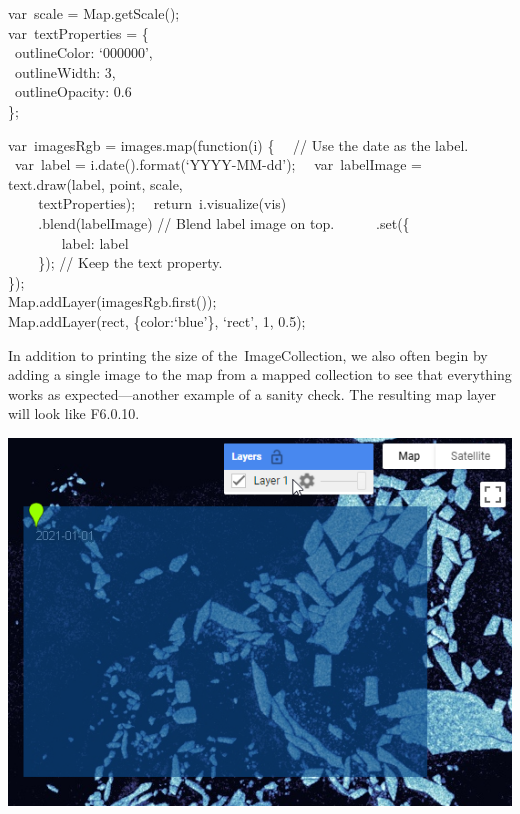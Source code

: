 \documentclass[
  letterpaper,
  DIV=11,
  numbers=noendperiod]{scrreprt}
\begin{document}
var~scale = Map.getScale();\\
var~textProperties = \{\\
\hspace*{0.333em} ~outlineColor: `000000',\\
\hspace*{0.333em} ~outlineWidth: 3,\\
\hspace*{0.333em} ~outlineOpacity: 0.6\\
\};

var~imagesRgb = images.map(function(i) \{~ ~// Use the date as the
label.~ ~var~label = i.date().format(`YYYY-MM-dd');~ ~var~labelImage =
text.draw(label, point, scale,\\
\hspace*{0.333em} ~ ~ ~textProperties);~ ~return~i.visualize(vis)\\
\hspace*{0.333em} ~ ~ ~.blend(labelImage) // Blend label image on top.~
~ ~ ~.set(\{\\
\hspace*{0.333em} ~ ~ ~ ~ ~label: label\\
\hspace*{0.333em} ~ ~ ~\}); // Keep the text property.\\
\});\\
Map.addLayer(imagesRgb.first());\\
Map.addLayer(rect, \{color:`blue'\}, `rect', 1, 0.5);

In addition to printing the size of the~ImageCollection, we also often
begin by adding a single image to the map from a mapped collection to
see that everything works as expected---another example of a sanity
check. The resulting map layer will look like F6.0.10.

\includegraphics{./F6/image6.png}
\end{document}
